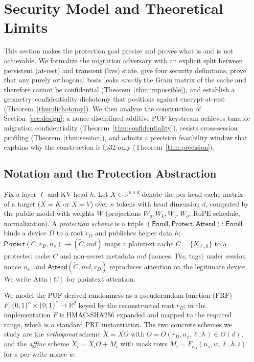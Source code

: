 \section{Security Model and Theoretical Limits}
\label{sec:theory}

This section makes the protection goal precise and proves what is and is not
achievable. We formalize the migration adversary with an explicit split between
persistent (at-rest) and transient (live) state, give four security definitions,
prove that any purely orthogonal basis leaks \emph{exactly} the Gram matrix of the
cache and therefore cannot be confidential (Theorem~\ref{thm:impossible}), and
establish a geometry--confidentiality dichotomy that positions \sys{} against
encrypt-at-rest (Theorem~\ref{thm:dichotomy}). We then analyze the construction of
Section~\ref{sec:design}: a nonce-disciplined additive PUF keystream achieves
tunable migration confidentiality (Theorem~\ref{thm:confidentiality}), resists
cross-session profiling (Theorem~\ref{thm:session}), and admits a precision
feasibility window that explains why the construction is fp32-only
(Theorem~\ref{thm:precision}).

\subsection{Notation and the Protection Abstraction}
\label{sec:theory-notation}

Fix a layer $\ell$ and KV head $h$. Let $X\in\mathbb{R}^{n\times d}$ denote the
per-head cache matrix of a target ($X=K$ or $X=V$) over $n$ tokens with head
dimension $d$, computed by the public model with weights $W$ (projections
$W_q,W_k,W_v,W_o$, RoPE schedule, normalization). A \emph{protection scheme} is a
triple $(\mathsf{Enroll},\mathsf{Protect},\mathsf{Attend})$:
$\mathsf{Enroll}$ binds a device $D$ to a root $r_D$ and publishes helper data
$h$; $\mathsf{Protect}(C,r_D,n_s)\to(\tilde C,\mathit{md})$ maps a plaintext cache
$C=\{X_{\ell,h}\}$ to a protected cache $\tilde C$ and non-secret metadata
$\mathit{md}$ (nonces, IVs, tags) under session nonce $n_s$; and
$\mathsf{Attend}(\tilde C,\mathit{md},r_D)$ reproduces attention on the legitimate
device. We write $\mathrm{Attn}(C)$ for plaintext attention.

We model the PUF-derived randomness as a pseudorandom function (PRF)
$F:\{0,1\}^{\kappa}\times\{0,1\}^{*}\to\mathbb{R}^{d}$ keyed by the reconstructed
root $r_D$; in the implementation $F$ is HMAC-SHA256 expanded and mapped to the
required range, which is a standard PRF instantiation. The two concrete schemes we
study are the \emph{orthogonal} scheme $\tilde X=XO$ with
$O=O(r_D,n_s,\ell,h)\in O(d)$, and the \emph{affine} scheme
$\tilde X_i = X_iO + M_i$ with mask rows $M_i=F_{r_D}(n_s,w,\ell,h,i)$ for a
per-write nonce $w$.

